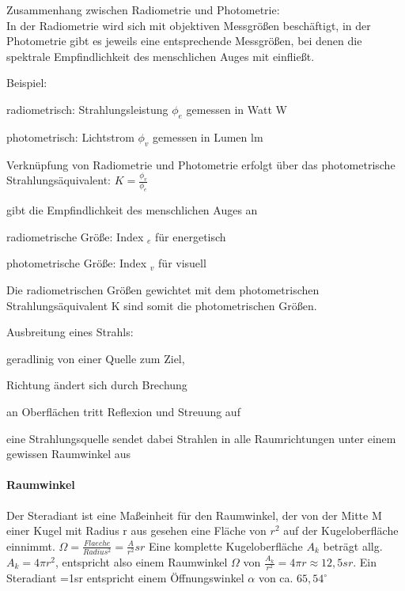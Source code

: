 \documentclass[landscape]{article}
\begin{document}
\begin{multicols}{3}
  Zusammenhang zwischen Radiometrie und Photometrie:\\
  In der Radiometrie wird sich mit objektiven Messgrößen beschäftigt, in der Photometrie gibt es jeweils eine entsprechende Messgrößen, bei denen die spektrale Empfindlichkeit des menschlichen Auges mit einfließt.
  \begin{itemize*}
    \item Beispiel:
    \item radiometrisch: Strahlungsleistung $\phi_e$ gemessen in Watt W
    \item photometrisch: Lichtstrom $\phi_v$ gemessen in Lumen lm
    \item Verknüpfung von Radiometrie und Photometrie erfolgt über das photometrische Strahlungsäquivalent: $K =\frac{\phi_v}{\phi_e}$
    \item gibt die Empfindlichkeit des menschlichen Auges an
    \item radiometrische Größe: Index $_e$ für energetisch
    \item photometrische Größe: Index $_v$ für visuell
  \end{itemize*}
  Die radiometrischen Größen gewichtet mit dem photometrischen Strahlungsäquivalent K sind somit die photometrischen Größen.
  
  Ausbreitung eines Strahls:
  \begin{itemize*}
    \item geradlinig von einer Quelle zum Ziel,
    \item Richtung ändert sich durch Brechung
    \item an Oberflächen tritt Reflexion und Streuung auf
    \item eine Strahlungsquelle sendet dabei Strahlen in alle Raumrichtungen unter einem gewissen Raumwinkel aus
  \end{itemize*}
  
  \paragraph{Raumwinkel}
  Der Steradiant ist eine Maßeinheit für den Raumwinkel, der von der Mitte M einer Kugel mit Radius r aus gesehen eine Fläche von $r^2$ auf der Kugeloberfläche einnimmt. $\Omega=\frac{Flaeche}{Radius^2}=\frac{A}{r^2}sr$
  Eine komplette Kugeloberfläche $A_k$ beträgt allg. $A_k = 4\pi r^2$, entspricht also einem Raumwinkel $\Omega$ von $\frac{A_k}{r^2}= 4\pi r\approx 12,5sr$. Ein Steradiant =1sr entspricht einem Öffnungswinkel $\alpha$ von ca. $65,54^{\circ}$
  

\end{multicols}
\end{document}
